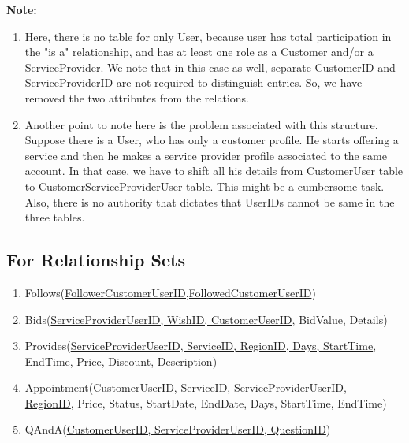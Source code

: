 \documentclass[a4paper]{article}
\begin{document}
\textbf{Note:} 
\begin{enumerate}

\item Here, there is no table for only User, because user has total participation in the "is a" relationship, and has at least one role as a Customer and/or a ServiceProvider. We note that in this case as well, separate CustomerID and ServiceProviderID are not required to distinguish entries. So, we have removed the two attributes from the relations.
\item Another point to note here is the problem associated with this structure. Suppose there is a User, who has only a customer profile. He starts offering a service and then he makes a service provider profile associated to the same account. In that case, we have to shift all his details from CustomerUser table to CustomerServiceProviderUser table. This might be a cumbersome task. Also, there is no authority that dictates that UserIDs cannot be same in the three tables.

\end{enumerate}


\subsection{For Relationship Sets}

\begin{enumerate}
\item Follows(\underline{FollowerCustomerUserID,FollowedCustomerUserID})
\item Bids(\underline{ServiceProviderUserID, WishID, CustomerUserID}, BidValue, Details)
\item Provides(\underline{ServiceProviderUserID, ServiceID, RegionID, Days, StartTime}, EndTime, Price, Discount, Description)
\item Appointment(\underline{CustomerUserID, ServiceID, ServiceProviderUserID},\\ \underline{RegionID}, Price, Status, StartDate, EndDate, Days, StartTime, EndTime)  
\item QAndA(\underline{CustomerUserID, ServiceProviderUserID, QuestionID})

\end{enumerate}
\end{document}
